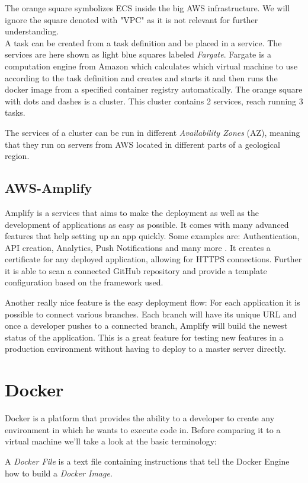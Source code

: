The orange square symbolizes ECS inside the big AWS infrastructure. We will ignore the square denoted with "VPC" as it is not relevant for further understanding.\\
A task can be created from a task definition and be placed in a service. The services are here shown as light blue squares labeled \emph{Fargate}. Fargate is a computation engine from Amazon which calculates which virtual machine to use according to the task definition and creates and starts it and then runs the docker image from a specified container registry automatically. \cite{AwsFargate} The orange square with dots and dashes is a cluster. This cluster contains 2 services, reach running 3 tasks. 

The services of a cluster can be run in different \emph{Availability Zones} (AZ), meaning that they run on servers from AWS located in different parts of a geological region.

\subsection{AWS-Amplify}
Amplify is a services that aims to make the deployment as well as the development of applications as easy as possible. It comes with many advanced features that help setting up an app quickly. Some examples are: Authentication, API creation, Analytics, Push Notifications and many more \cite{AwsAmplify}. It creates a certificate for any deployed application, allowing for HTTPS connections. Further it is able to scan a connected GitHub repository and provide a template configuration based on the framework used.

Another really nice feature is the easy deployment flow: For each application it is possible to connect various branches. Each branch will have its unique URL and once a developer pushes to a connected branch, Amplify will build the newest status of the application. This is a great feature for testing new features in a production environment without having to deploy to a master server directly.

\section{Docker}
Docker is a platform that provides the ability to a developer to create any environment in which he wants to execute code in.
Before comparing it to a virtual machine we'll take a look at the basic terminology:

A \emph{Docker File} is a text file containing instructions that tell the Docker Engine how to build a \emph{Docker Image}. \cite{NickDocker}

